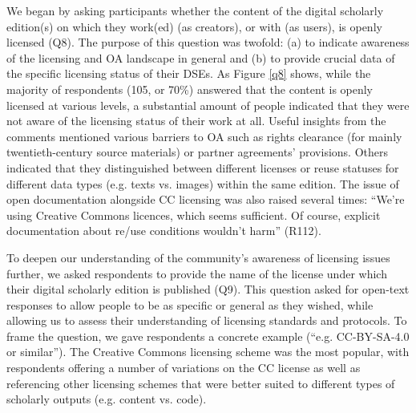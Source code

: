 \begin{paper}
We began by asking participants whether the content of the digital
scholarly edition(s) on which they work(ed) (as creators), or with (as
users), is openly licensed (Q8). The purpose of this question was
twofold: (a) to indicate awareness of the licensing and OA landscape in
general and (b) to provide crucial data of the specific licensing status
of their DSEs. As Figure \ref{q8} shows, while the majority of respondents
(105, or 70\%) answered that the content is openly licensed at various
levels, a substantial amount of people indicated that they were not
aware of the licensing status of their work at all. Useful insights from
the comments mentioned various barriers to OA such as rights clearance
(for mainly twentieth-century source materials) or partner agreements'
provisions. Others indicated that they distinguished between different
licenses or reuse statuses for different data types (e.g. texts vs.
images) within the same edition. The issue of open documentation
alongside CC licensing was also raised several times: ``We're using
Creative Commons licences, which seems sufficient. Of course, explicit
documentation about re/use conditions wouldn't harm'' (R112).

To deepen our understanding of the community's awareness of licensing
issues further, we asked respondents to provide the name of the license
under which their digital scholarly edition is published (Q9). This
question asked for open-text responses to allow people to be as specific
or general as they wished, while allowing us to assess their
understanding of licensing standards and protocols. To frame the
question, we gave respondents a concrete example (``e.g. CC-BY-SA-4.0 or
similar''). The Creative Commons licensing scheme was the most popular,
with respondents offering a number of variations on the CC license as
well as referencing other licensing schemes that were better suited to
different types of scholarly outputs (e.g. content vs. code).


\end{paper}
